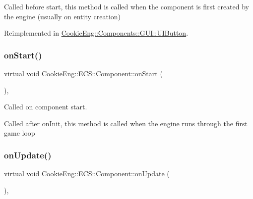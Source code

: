Called before start, this method is called when the component is first created by the engine (usually on entity creation) 

Reimplemented in \hyperlink{class_cookie_eng_1_1_components_1_1_g_u_i_1_1_u_i_button_ad045368b7a595ddaa70cc18112f98221}{Cookie\+Eng\+::\+Components\+::\+G\+U\+I\+::\+U\+I\+Button}.

\mbox{\label{class_cookie_eng_1_1_e_c_s_1_1_component_aaf8523586d57c3e40d4149f228755139}} 
\subsubsection{\texorpdfstring{on\+Start()}{onStart()}}
{\footnotesize\ttfamily virtual void Cookie\+Eng\+::\+E\+C\+S\+::\+Component\+::on\+Start (\begin{DoxyParamCaption}{ }\end{DoxyParamCaption})\hspace{0.3cm}{\ttfamily [inline]}, {\ttfamily [virtual]}}



Called on component start. 

Called after on\+Init, this method is called when the engine runs through the first game loop \mbox{\label{class_cookie_eng_1_1_e_c_s_1_1_component_a7c4a11f71e21181bc6f56841565b9a56}} 
\subsubsection{\texorpdfstring{on\+Update()}{onUpdate()}}
{\footnotesize\ttfamily virtual void Cookie\+Eng\+::\+E\+C\+S\+::\+Component\+::on\+Update (\begin{DoxyParamCaption}{ }\end{DoxyParamCaption})\hspace{0.3cm}{\ttfamily [inline]}, {\ttfamily [virtual]}}



